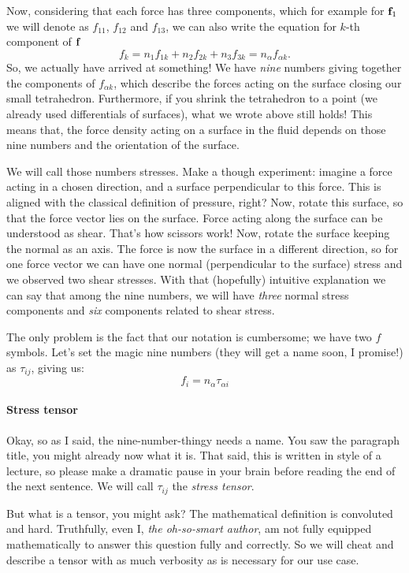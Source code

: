\documentclass{article}
\begin{document}
Now, considering that each force has three components, which for example for 
\(\vb{f}_1\) we will denote as \(f_{11}\), \(f_{12}\) and \(f_{13}\), we can 
also write the equation for \(k\)-th component of \(\vb{f}\)
\[
  f_k = n_1 f_{1k} + n_2 f_{2k} +n_3 f_{3k} = n_\alpha f_{\alpha k}.
\]
So, we actually have arrived at something! We have \emph{nine} numbers giving
together the components of \(f_{\alpha k}\), which describe the forces acting 
on the surface closing our small tetrahedron. Furthermore, if you shrink the 
tetrahedron to a point (we already used differentials of surfaces), what we 
wrote above still holds! This means that, the force density acting on a surface 
in the fluid depends on those nine numbers and the orientation of the surface.

We will call those numbers stresses. Make a though experiment: imagine a force 
acting in a chosen direction, and a surface perpendicular to this force. This 
is aligned with the classical definition of pressure, right? Now, rotate this 
surface, so that the force vector lies on the surface. Force acting along the 
surface can be understood as shear. That's how scissors work! Now, rotate the 
surface keeping the normal as an axis. The force is now  the 
surface in a different direction, so for one force vector we can have one normal 
(perpendicular to the surface)
stress and we observed two shear stresses. With that (hopefully) intuitive 
explanation we can say that among the nine numbers, we will have \emph{three}
normal stress components and \emph{six} components related to shear stress.

The only problem is the fact that our notation is cumbersome; we have two \(f\)
symbols. Let's set the magic nine numbers (they will get a name soon, I promise!) 
as \(\tau_{ij}\), giving us:
\[
  f_i = n_\alpha \tau_{\alpha i}
\]

\paragraph{Stress tensor}
Okay, so as I said, the nine-number-thingy needs a name. You saw the paragraph
title, you might already now what it is. That said, this is written in style of 
a lecture, so please make a dramatic pause in your brain before reading the end of the 
next sentence. We will call \(\tau_{ij}\) the \emph{stress tensor}. 

But what is a tensor, you might ask? The mathematical definition is convoluted and 
hard. Truthfully, even I, \emph{the oh-so-smart author}, am not fully equipped 
mathematically to answer this question fully and correctly. So we will cheat 
and describe a tensor with as much verbosity as is necessary for our use case.
\end{document}
